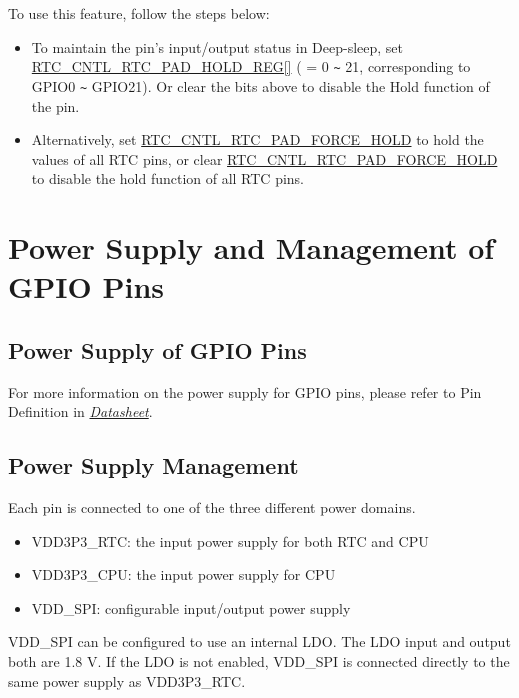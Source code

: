 \documentclass[main\_\_EN.tex]{subfiles}
\begin{document}
\begin{itemize}
To use this feature, follow the steps below:

\begin{itemize}
    \item To maintain the pin's input/output status in Deep-sleep, set \hyperref[regdesc:RTCCNTLRTCPADHOLDREG]{RTC\_CNTL\_RTC\_PAD\_HOLD\_REG[]} ( = 0 \verb+~+ 21, corresponding to GPIO0 \verb+~+ GPIO21). Or clear the bits above to disable the Hold function of the pin.
    \item Alternatively, set \hyperref[fielddesc:RTCCNTLRTCPADFORCEHOLD]{RTC\_CNTL\_RTC\_PAD\_FORCE\_HOLD} to hold the values of all RTC pins, or clear \hyperref[fielddesc:RTCCNTLRTCPADFORCEHOLD]{RTC\_CNTL\_RTC\_PAD\_FORCE\_HOLD} to disable the hold function of all RTC pins.
\end{itemize}

\end{itemize}

\section{Power Supply and Management of GPIO Pins}\label{I/O Pad Power Supplies}

\subsection{Power Supply of GPIO Pins}
For more information on the power supply for GPIO pins, please refer to Pin Definition in  {\it{\href{https://www.espressif.com/sites/default/files/documentation/esp32-s3_datasheet_en.pdf}{\chipname{} Datasheet}}}.

\subsection{Power Supply Management}

Each \chipname{} pin is connected to one of the three different power domains.

\begin{itemize}
    \item VDD3P3\_RTC: the input power supply for both RTC and CPU
    \item VDD3P3\_CPU: the input power supply for CPU
    \item VDD\_SPI: configurable input/output power supply
\end{itemize}

VDD\_SPI can be configured to use an internal LDO. The LDO input and output both are 1.8 V. If the LDO is not enabled, VDD\_SPI is connected directly to the same power supply as VDD3P3\_RTC.
\end{document}
